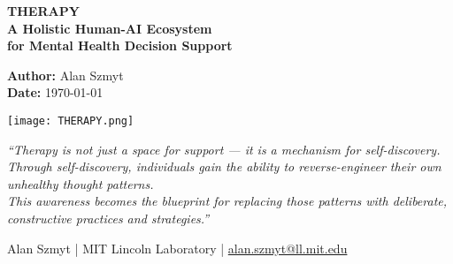 \begin{titlepage}
\thispagestyle{empty}
\centering

\begin{framed}
\centering

\vspace{0.5cm}

{\LARGE\bfseries THERAPY}\\[0.6em]
{\large\bfseries A Holistic Human-AI Ecosystem}\\[0.25em]
{\large\bfseries for Mental Health Decision Support}

\vspace{1.2cm}

{\normalsize
\textbf{Author:} Alan Szmyt \\
\textbf{Date:} \today
}

\vspace{1.5cm}

\texttt{[image: THERAPY.png]}

\vspace{1.5cm}

\begin{minipage}{0.9\textwidth}
\centering
\itshape
“Therapy is not just a space for support — it is a mechanism for self-discovery.\\
Through self-discovery, individuals gain the ability to reverse-engineer their own unhealthy thought patterns.\\
This awareness becomes the blueprint for replacing those patterns with deliberate, constructive practices and strategies.”
\end{minipage}

\vspace{1cm}
\end{framed}

\vspace{0.5cm}

\begin{center}
\footnotesize
Alan Szmyt \quad | \quad MIT Lincoln Laboratory \quad | \quad \href{mailto:alan.szmyt@ll.mit.edu}{alan.szmyt@ll.mit.edu}
\end{center}

\end{titlepage}
